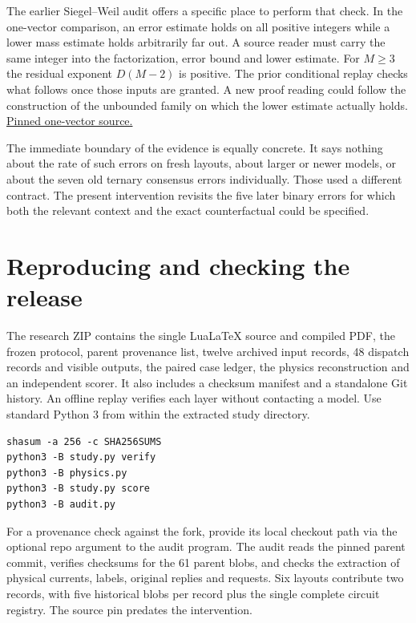 \documentclass[12pt,letterpaper]{article}
\begin{document}
The earlier Siegel--Weil audit offers a specific place to perform that check. In the one-vector comparison, an error estimate holds on all positive integers while a lower mass estimate holds arbitrarily far out. A source reader must carry the same integer into the factorization, error bound and lower estimate. For $M\geq3$ the residual exponent $D(M-2)$ is positive. The prior conditional replay checks what follows once those inputs are granted. A new proof reading could follow the construction of the unbounded family on which the lower estimate actually holds. \href{https://github.com/nousentllc/riemann-hypothesis/blob/40e56bab026552e089d7afcfeff08d2defb9c005/src/CompanionTheory/AutomorphicTheory/ThetaDilations/SwOne.lean}{Pinned one-vector source.}

The immediate boundary of the evidence is equally concrete. It says nothing about the rate of such errors on fresh layouts, about larger or newer models, or about the seven old ternary consensus errors individually. Those used a different contract. The present intervention revisits the five later binary errors for which both the relevant context and the exact counterfactual could be specified.

\clearpage\section{Reproducing and checking the release}

The research ZIP contains the single LuaLaTeX source and compiled PDF, the frozen protocol, parent provenance list, twelve archived input records, 48 dispatch records and visible outputs, the paired case ledger, the physics reconstruction and an independent scorer. It also includes a checksum manifest and a standalone Git history. An offline replay verifies each layer without contacting a model. Use standard Python 3 from within the extracted study directory.

\begin{verbatim}
shasum -a 256 -c SHA256SUMS
python3 -B study.py verify
python3 -B physics.py
python3 -B study.py score
python3 -B audit.py
\end{verbatim}

For a provenance check against the fork, provide its local checkout path via the optional repo argument to the audit program. The audit reads the pinned parent commit, verifies checksums for the 61 parent blobs, and checks the extraction of physical currents, labels, original replies and requests. Six layouts contribute two records, with five historical blobs per record plus the single complete circuit registry. The source pin predates the intervention.
\end{document}
